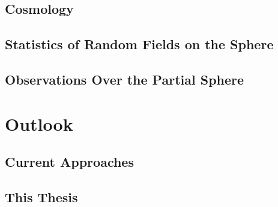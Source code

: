 \subsection{Cosmology}





\subsection{Statistics of Random Fields on the Sphere}

\subsection{Observations Over the Partial Sphere}

\section{Outlook}

\subsection{Current Approaches}

\subsection{This Thesis}
